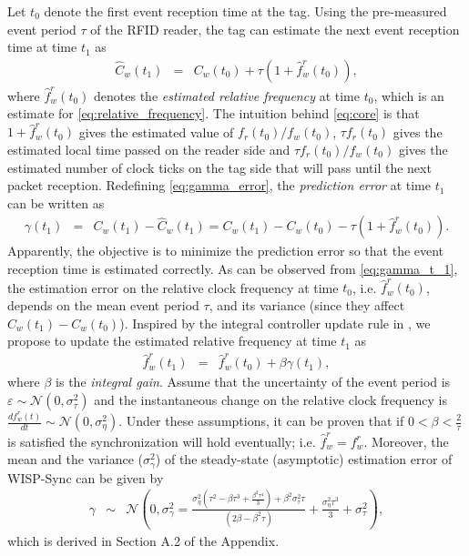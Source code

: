\documentclass[10pt,journal,compsoc]{IEEEtran}
\begin{document}
Let $t_0$ denote the first event reception time at the tag. Using the pre-measured event period $\tau$ of the RFID reader, the tag can estimate the next event reception time at time $t_1$ as
\begin{eqnarray}
\hat{C}_w(t_1) &=& C_w(t_0)+\tau(1+\hat{f}_w^r(t_0)), \label{eq:core}
\end{eqnarray}
where $\hat{f}_w^r(t_0)$ denotes the \emph{estimated relative frequency} at time $t_0$, which is an estimate for \eqref{eq:relative_frequency}. The intuition behind \eqref{eq:core} is that $1+\hat{f}_w^r(t_0)$ gives the estimated value of $f_r(t_0)/f_w(t_0)$, $\tau f_r(t_0)$ gives the estimated local time passed on the reader side and $\tau f_r(t_0)/f_w(t_0)$ gives the estimated number of clock ticks on the tag side that will pass until the next packet reception. Redefining \eqref{eq:gamma_error}, the \emph{prediction error} at time $t_1$ can be written as
\begin{eqnarray}
\gamma(t_1) & \!\!\!\!\!=\!\!\!\!\!\! & 
C_{w}(t_{1}\!)\!-\!\hat{C}_{w}(t_{1}\!) \!=\! 
C_{w}(t_{1}\!)\!-\!C_{w}(t_{0}\!)\!-\!\tau(1\!\!+\!\!\hat{f}_{w}^{r}(t_0\!)). \label{eq:gamma_t_1}
\end{eqnarray}
Apparently, the objective is to minimize the prediction error so that the event reception time is estimated correctly. As can be observed from \eqref{eq:gamma_t_1}, the estimation error on the relative clock frequency at time $t_0$, i.e. $\hat{f}_w^r(t_0)$, depends on the mean event period $\tau$, and its variance (since they affect $C_w(t_1)-C_w(t_0)$). Inspired by the integral controller update rule in \cite[Section III, (5)]{pi2015}, we propose to update the estimated relative frequency at time $t_1$ as
\begin{eqnarray}
\hat{f}_{w}^{r}(t_1) &=& \hat{f}_{w}^{r}(t_0)+\beta\gamma(t_1), 
\label{eq:update_rule}
\end{eqnarray}
where $\beta$ is the \emph{integral gain}. Assume that the uncertainty of the event period is $\varepsilon\sim\mathcal{N}(0,\sigma^2_{\tau})$ and the instantaneous change on the relative clock frequency is $\frac{df_{w}^{r}(t)}{dt}\sim\mathcal{N}(0,\sigma_{\eta}^{2})$. Under these assumptions, it can be proven that if $0<\beta<\frac{2}{\tau}$ is satisfied the synchronization will hold eventually; i.e. $\hat{f}_{w}^{r}=f_{w}^{r}$. Moreover, the mean and the variance ($\sigma^2_\gamma$) of the steady-state (asymptotic) estimation error of WISP-Sync can be given by 
\begin{eqnarray}
\gamma & \!\!\!\!\!\sim\!\!\!\!\! & \mathcal{N} \!\!\left(\!\!0,\sigma^2_\gamma\!\!=\!\!\frac{\sigma^2_{\eta}\!\left(\!\tau^2\!-\!\beta\tau^3\!+\!\frac{\beta^2\tau^4}{3}\!\right)\!\!+\!\!\beta^2\sigma^2_{\tau}\tau}{(2\beta-\beta^2\tau)}\!\!+\!\!\frac{\sigma^2_{\eta}\tau^3}{3}\!+\!\sigma^2_{\tau} \!\!\right),
\label{eq:sync_performance}
\end{eqnarray}
which is derived in Section A.2 of the Appendix.
\end{document}
